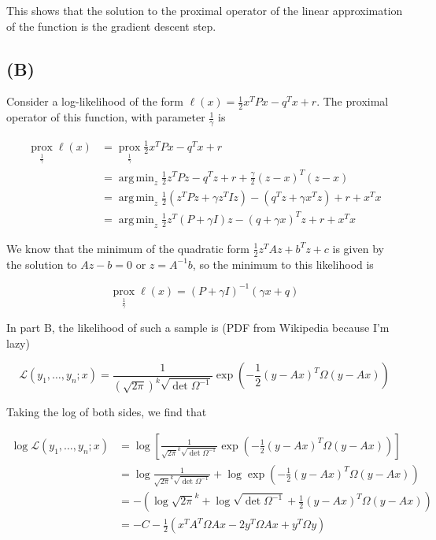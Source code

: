 \documentclass{article}
\DeclareMathOperator*{\argmin}{arg\,min}
\newcommand{\prox}{ \mathop{\mathrm{prox}} }
\newcommand{\calL}{{\mathcal{L}}}
\begin{document}
This shows that the solution to the proximal operator of the linear
approximation of the function is the gradient descent step.

\subsection*{(B)}

Consider a log-likelihood of the form $\ell(x) = \frac{1}{2} x^TPx - q^Tx + r$.
The proximal operator of this function, with parameter $\frac{1}{\gamma}$ is

\begin{align*}
  \prox\limits_{\frac{1}{\gamma}} \ell(x)
  &= \prox\limits_{\frac{1}{\gamma}} \frac{1}{2} x^TPx - q^Tx + r\\
  &= \argmin_z \frac{1}{2} z^TPz - q^Tz + r + \frac{\gamma}{2} (z - x)^T(z - x)\\
  &= \argmin_z \frac{1}{2} \left( z^TPz + \gamma z^T I z \right)
    - (q^Tz + \gamma x^Tz)  + r + x^Tx \\
  &= \argmin_z \frac{1}{2} z^T(P + \gamma I)z - (q + \gamma x)^T z + r + x^Tx
\end{align*}

We know that the minimum of the quadratic form $\frac{1}{2} z^TAz + b^Tz + c$ is
given by the solution to $Az - b = 0$ or $z = A^{-1}b$, so the minimum to this
likelihood is

\[
  \prox\limits_{\frac{1}{\gamma}} \ell(x) = \left( P + \gamma I \right)^{-1} (\gamma
  x + q)
\]


In part B, the likelihood of such a sample is (PDF from Wikipedia because I'm lazy)

\[
  \calL (y_1, \dots, y_n ; x) = \frac{1}{\left( \sqrt{2\pi}\right)^k
    \sqrt{\det{\Omega^{-1}}}} \exp \left( -\frac{1}{2}(y - Ax)^T
  \Omega(y - Ax)\right)
\]

Taking the log of both sides, we find that

\begin{align*}
  \log \calL (y_1, \dots, y_n ; x)
  &= \log \left[ \frac{1}{\sqrt{2\pi}^k\sqrt{\det{\Omega^{-1}}}} \exp \left( -\frac{1}{2}(y - Ax)^T
    \Omega(y - Ax)\right) \right]\\
  &= \log \frac{1}{\sqrt{2\pi}^k\sqrt{\det{\Omega^{-1}}}} + \log \exp \left( -\frac{1}{2}(y - Ax)^T
    \Omega(y - Ax)\right)\\
  &=-\left( \log\sqrt{2\pi}^k + \log \sqrt{\det{\Omega^{-1}}} + \frac{1}{2} (y - Ax)^T \Omega(y - Ax)\right)\\
  &= -C - \frac{1}{2} \left( x^TA^T\Omega A x - 2 y^T\Omega Ax + y^T \Omega y \right)
\end{align*}
\end{document}
